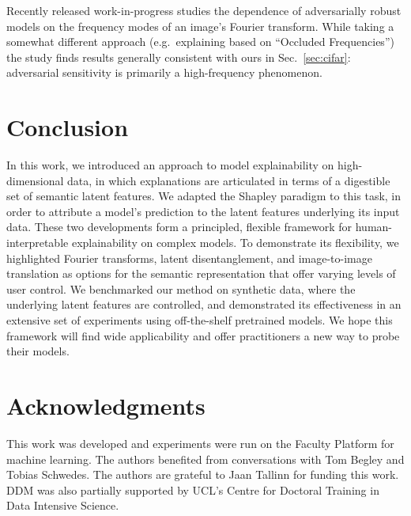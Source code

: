 \documentclass{article}
\DeclareRobustCommand{\Sec}[1]{Sec.~\ref{sec:#1}}
\begin{document}
Recently released work-in-progress \citep{frequencyexplanations} studies the dependence of adversarially robust models on the frequency modes of an image's Fourier transform. While taking a somewhat different approach (e.g.~explaining based on ``Occluded Frequencies'') the study finds results generally consistent with ours in \Sec{cifar}: adversarial sensitivity is primarily a high-frequency phenomenon.


\section{Conclusion}
\label{sec:conclusion}


In this work, we introduced an approach to model explainability on high-dimensional data, in which explanations are articulated in terms of a digestible set of semantic latent features. We adapted the Shapley paradigm to this task, in order to attribute a model's prediction to the latent features underlying its input data. These two developments form a principled, flexible framework for human-interpretable explainability on complex models. To demonstrate its flexibility, we highlighted Fourier transforms, latent disentanglement, and image-to-image translation as options for the semantic representation that offer varying levels of user control. We benchmarked our method on synthetic data, where the underlying latent features are controlled, and demonstrated its effectiveness in an extensive set of experiments using off-the-shelf pretrained models. We hope this framework will find wide applicability and offer practitioners a new way to probe their models.


\section*{Acknowledgments}


This work was developed and experiments were run on the Faculty Platform for machine learning. 
The authors benefited from conversations with Tom Begley and Tobias Schwedes. 
The authors are grateful to Jaan Tallinn for funding this work.
DDM was also partially supported by UCL's Centre for Doctoral Training in Data Intensive Science.




\end{document}
